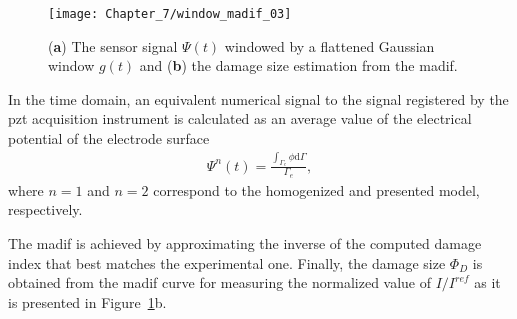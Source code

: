 \begin{figure}[H]
	\texttt{[image: Chapter\_7/window\_madif\_03]}
	\caption{(\textbf{a}) The %
		sensor signal \(\Psi(t)\) windowed by a flattened Gaussian window \(g(t)\) and (\textbf{b}) the damage size estimation from the \ac{madif}.}
	\label{fig:window_madif}
\end{figure}
In the time domain, an equivalent numerical signal to the signal registered by the \ac{pzt} acquisition instrument is calculated as an average value of the electrical potential of the electrode surface
\begin{eqnarray}
	\Psi^{n}(t) = \frac{\int_{\Gamma_e}\phi\mathrm{d}\Gamma}{\Gamma_e},
	\label{eq:psi}
\end{eqnarray}
where \(n=1\) and \(n=2\) correspond to the homogenized and presented model, respectively.

The \ac{madif} is achieved by approximating the inverse of the computed damage index that best matches the experimental one.
Finally, the damage size \(\Phi_D\) is obtained from the \ac{madif} curve for measuring the normalized value of \(I/I^{ref}\) as it is presented in Figure~\ref{fig:window_madif}b.